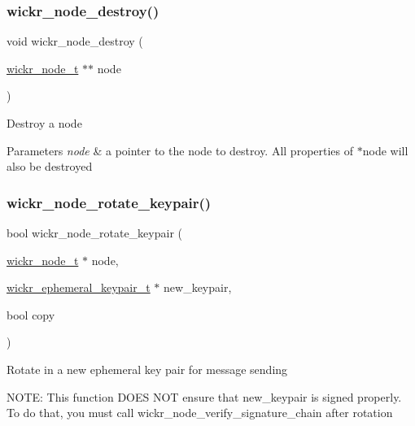 \subsubsection{\texorpdfstring{wickr\_node\_destroy()}{wickr\_node\_destroy()}}
{\footnotesize\ttfamily void wickr\+\_\+node\+\_\+destroy (\begin{DoxyParamCaption}\item[{\mbox{\hyperlink{structwickr__node}{wickr\+\_\+node\+\_\+t}} $\ast$$\ast$}]{node }\end{DoxyParamCaption})}

Destroy a node


\begin{DoxyParams}{Parameters}
{\em node} & a pointer to the node to destroy. All properties of \textquotesingle{}$\ast$node\textquotesingle{} will also be destroyed \\
\hline
\end{DoxyParams}
\mbox{\label{group__wickr__node_ga2ed650b947df7316cf0f915805ac5aa4}} 
\subsubsection{\texorpdfstring{wickr\_node\_rotate\_keypair()}{wickr\_node\_rotate\_keypair()}}
{\footnotesize\ttfamily bool wickr\+\_\+node\+\_\+rotate\+\_\+keypair (\begin{DoxyParamCaption}\item[{\mbox{\hyperlink{structwickr__node}{wickr\+\_\+node\+\_\+t}} $\ast$}]{node,  }\item[{\mbox{\hyperlink{structwickr__ephemeral__keypair}{wickr\+\_\+ephemeral\+\_\+keypair\+\_\+t}} $\ast$}]{new\+\_\+keypair,  }\item[{bool}]{copy }\end{DoxyParamCaption})}

Rotate in a new ephemeral key pair for message sending

N\+O\+TE\+: This function D\+O\+ES N\+OT ensure that new\+\_\+keypair is signed properly. To do that, you must call \textquotesingle{}wickr\+\_\+node\+\_\+verify\+\_\+signature\+\_\+chain\textquotesingle{} after rotation


